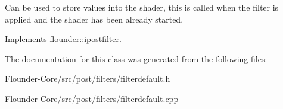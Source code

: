 Can be used to store values into the shader, this is called when the filter is applied and the shader has been already started. 



Implements \hyperlink{classflounder_1_1ipostfilter_a9b658b4672718d5ac36539875bde722e}{flounder\+::ipostfilter}.



The documentation for this class was generated from the following files\+:\begin{DoxyCompactItemize}
\item 
Flounder-\/\+Core/src/post/filters/filterdefault.\+h\item 
Flounder-\/\+Core/src/post/filters/filterdefault.\+cpp\end{DoxyCompactItemize}
